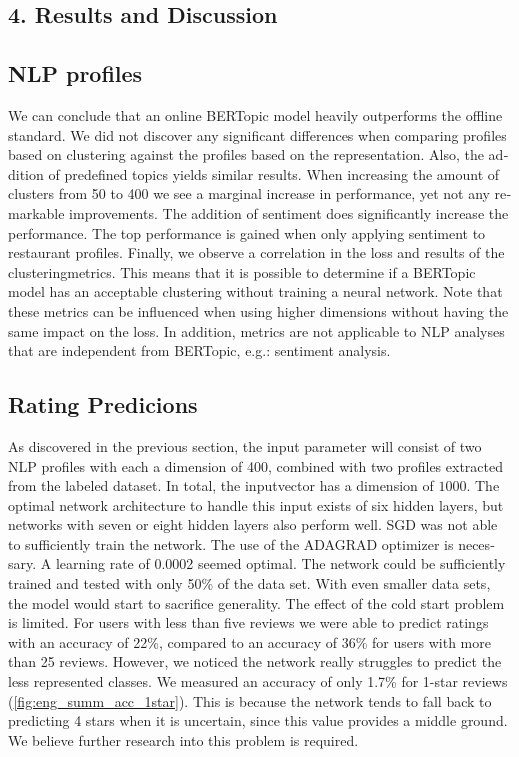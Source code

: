 \begin{otherlanguage}{english}
\begin{multicols}{2}
\section*{4. Results and Discussion}
\subsection*{NLP profiles}
We can conclude that an online BERTopic model heavily outperforms the offline standard. We did not discover any significant differences when comparing profiles based on clustering against the profiles based on the representation. Also, the addition of predefined topics yields similar results. When increasing the amount of clusters from 50 to 400 we see a marginal increase in performance, yet not any remarkable improvements. The addition of sentiment does significantly increase the performance. The top performance is gained when only applying sentiment to restaurant profiles. \newline
Finally, we observe a correlation in the loss and results of the clusteringmetrics. This means that it is possible to determine if a BERTopic model has an acceptable clustering without training a neural network. Note that these metrics can be influenced when using higher dimensions without having the same impact on the loss. In addition, metrics are not applicable to NLP analyses that are independent from BERTopic, e.g.: sentiment analysis.


\subsection*{Rating Predicions}
As discovered in the previous section, the input parameter will consist of two NLP profiles with each a dimension of 400, combined with two profiles extracted from the labeled dataset. In total, the inputvector has a dimension of $1000$. The optimal network architecture to handle this input exists of six hidden layers, but networks with seven or eight hidden layers also perform well.\newline
SGD was not able to sufficiently train the network. The use of the ADAGRAD optimizer is necessary. A learning rate of 0.0002 seemed optimal. The network could be sufficiently trained and tested with only 50\% of the data set. With even smaller data sets, the model would start to sacrifice generality.\newline
The effect of the cold start problem is limited. For users with less than five reviews we were able to predict ratings with an accuracy of 22\%, compared to an accuracy of 36\% for users with more than 25 reviews. However, we noticed the network really struggles to predict the less represented classes. We measured an accuracy of only 1.7\% for 1-star reviews (\autoref{fig:eng_summ_acc_1star}). This is because the network tends to fall back to predicting 4 stars when it is uncertain, since this value provides a middle ground. We believe further research into this problem is required.


\end{multicols}
\end{otherlanguage}
